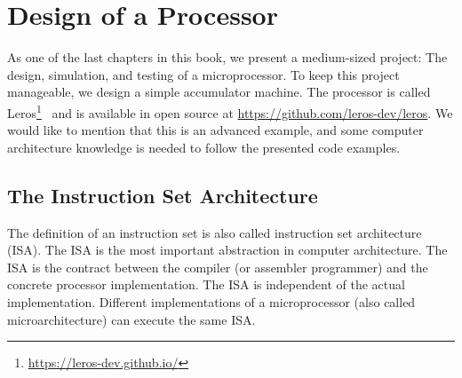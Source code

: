 \documentclass[%
    10pt,
    headinclude, footexclude,
    openright, %
    notitlepage,
    cleardoubleempty,
    headsepline,
    pointlessnumbers,
    bibtotoc, idxtotoc,
    ]{scrbook}
\newcommand{\myref}[2]{\href{#1}{#2}}
\renewcommand{\myref}[2]{{#2}{\footnote{\url{#1}}}}
\begin{document}
\chapter{Design of a Processor}
\label{chap:leros}


As one of the last chapters in this book, we present a medium-sized project:
The design, simulation, and testing of a microprocessor.
To keep this project manageable, we design a simple accumulator machine.
The processor is called \myref{https://leros-dev.github.io/}{Leros}~\cite{leros:arcs2019}
and is available in open source at \url{https://github.com/leros-dev/leros}.
We would like to mention that this is an advanced example, and some computer
architecture knowledge is needed to follow the presented code examples.

\section{The Instruction Set Architecture}

The definition of an instruction set is also called instruction set architecture (ISA).
The ISA is the most important abstraction in computer architecture.
The ISA is the contract between the compiler (or assembler programmer) and the
concrete processor implementation.
The ISA is independent of the actual implementation.
Different implementations of a microprocessor (also called microarchitecture)
can execute the same ISA.
\end{document}
